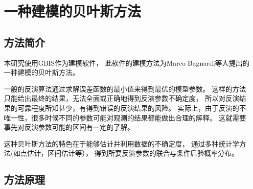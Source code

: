 \chapter{一种建模的贝叶斯方法}
\label{ch:pm}
\section{方法简介}
本研究使用GBIS作为建模软件，
此软件的建模方法为Marco Bagnardi等人提出的一种建模的贝叶斯方法。

一般的反演算法通过求解误差函数的最小值来得到最优的模型参数。
这样的方法只能给出最终的结果，无法全面或正确地得到反演参数不确定度，
所以对反演结果的可靠程度所知甚少，有得到错误的反演结果的风险。
实际上，由于反演的不唯一性，很多时候不同的参数可能对观测的结果都能做出合理的解释。
这就需要事先对反演参数可能的区间有一定的了解。

这种贝叶斯方法的特色在于能够估计并利用数据的不确定度，
通过多种统计学方法(如点估计，区间估计等），
得到所要反演参数的联合与条件后验概率分布。

\section{方法原理}

